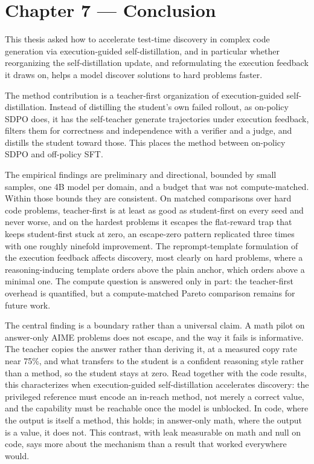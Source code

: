 \chapter{Chapter 7 --- Conclusion}\label{chapter-7-conclusion}

This thesis asked how to accelerate test-time discovery in complex code generation via execution-guided self-distillation, and in particular whether reorganizing the self-distillation update, and reformulating the execution feedback it draws on, helps a model discover solutions to hard problems faster.

The method contribution is a teacher-first organization of execution-guided self-distillation. Instead of distilling the student's own failed rollout, as on-policy SDPO does, it has the self-teacher generate trajectories under execution feedback, filters them for correctness and independence with a verifier and a judge, and distills the student toward those. This places the method between on-policy SDPO and off-policy SFT.

The empirical findings are preliminary and directional, bounded by small samples, one 4B model per domain, and a budget that was not compute-matched. Within those bounds they are consistent. On matched comparisons over hard code problems, teacher-first is at least as good as student-first on every seed and never worse, and on the hardest problems it escapes the flat-reward trap that keeps student-first stuck at zero, an escape-zero pattern replicated three times with one roughly ninefold improvement. The reprompt-template formulation of the execution feedback affects discovery, most clearly on hard problems, where a reasoning-inducing template orders above the plain anchor, which orders above a minimal one. The compute question is answered only in part: the teacher-first overhead is quantified, but a compute-matched Pareto comparison remains for future work.

The central finding is a boundary rather than a universal claim. A math pilot on answer-only AIME problems does not escape, and the way it fails is informative. The teacher copies the answer rather than deriving it, at a measured copy rate near 75\%, and what transfers to the student is a confident reasoning style rather than a method, so the student stays at zero. Read together with the code results, this characterizes when execution-guided self-distillation accelerates discovery: the privileged reference must encode an in-reach method, not merely a correct value, and the capability must be reachable once the model is unblocked. In code, where the output is itself a method, this holds; in answer-only math, where the output is a value, it does not. This contrast, with leak measurable on math and null on code, says more about the mechanism than a result that worked everywhere would.

